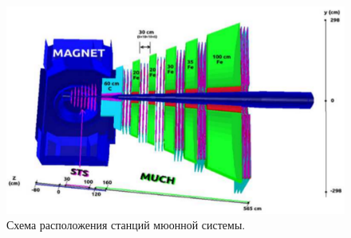 \begin{figure}[H]
\centering
\includegraphics[width=1.0\textwidth]{pictures/MUCH.png}
\caption{Схема расположения станций мюонной системы.}
\label{fig:MUCH}
\end{figure}

